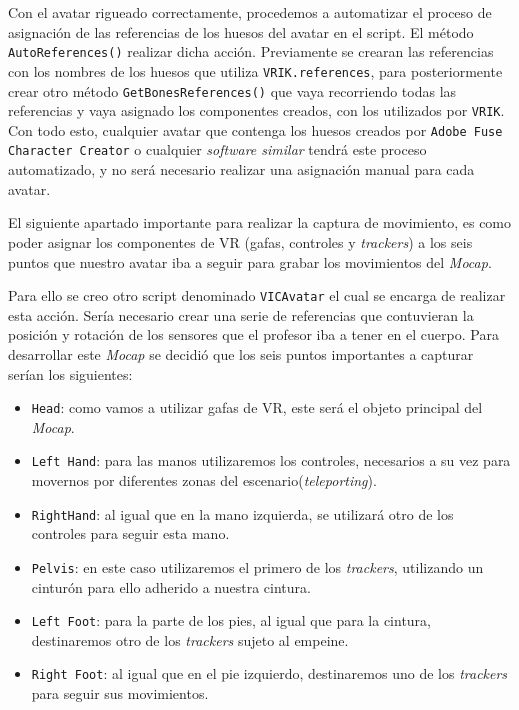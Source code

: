 Con el avatar rigueado correctamente, procedemos a automatizar el proceso de asignación de las referencias de los huesos del avatar en el script. El método \texttt{AutoReferences()} realizar dicha acción. Previamente se crearan las referencias con los nombres de los huesos que utiliza \texttt{VRIK.references}, para posteriormente crear otro método \texttt{GetBonesReferences()} que vaya recorriendo todas las referencias y vaya asignado los componentes creados, con los utilizados por \texttt{VRIK}. Con todo esto, cualquier avatar que contenga los huesos creados por \texttt{Adobe Fuse Character Creator} o cualquier \textit{software similar} tendrá este proceso automatizado, y no será necesario realizar una asignación manual para cada avatar.

El siguiente apartado importante para realizar la captura de movimiento, es como poder asignar los componentes de VR (gafas, controles y \textit{trackers}) a los seis puntos que nuestro avatar iba a seguir para grabar los movimientos del \textit{Mocap}.

Para ello se creo otro script denominado \texttt{VICAvatar} el cual se encarga de realizar esta acción. Sería necesario crear una serie de referencias que contuvieran la posición y rotación de los sensores que el profesor iba a tener en el cuerpo. Para desarrollar este \textit{Mocap} se decidió que los seis puntos importantes a capturar serían los siguientes:

\begin{itemize}
    \item \texttt{Head}: como vamos a utilizar gafas de VR, este será el objeto principal del \textit{Mocap}.
    \item \texttt{Left Hand}: para las manos utilizaremos los controles, necesarios a su vez para movernos por diferentes zonas del escenario(\textit{teleporting}).
    \item \texttt{RightHand}: al igual que en la mano izquierda, se utilizará otro de los controles para seguir esta mano.
    \item \texttt{Pelvis}: en este caso utilizaremos el primero de los \textit{trackers}, utilizando un cinturón para ello adherido a nuestra cintura.
    \item \texttt{Left Foot}: para la parte de los pies, al igual que para la cintura, destinaremos otro de los \textit{trackers} sujeto al empeine.
    \item \texttt{Right Foot}: al igual que en el pie izquierdo, destinaremos uno de los \textit{trackers} para seguir sus movimientos.
\end{itemize}

